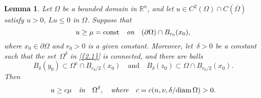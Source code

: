 \documentclass[regno,12pt]{amsart}
\newtheorem{lemma}[theorem]{Lemma}
\theoremstyle{definition}
\theoremstyle{remark}
\begin{document}
\begin{lemma}\label{L2.3}
    Let $\Omega$ be a bounded domain in ${{\mathbb R}^n}$, and let $u\in C^2(\Omega)\cap C({\overline{\Omega}})$ satisfy $u>0,\,Lu\le 0$ in $\Omega$. Suppose that
    \begin{equation}\label{2.8}
        u\ge\mu={{\rm const}}{\quad\emph{{on}}\quad} ({\partial\Omega})\cap B_{r_0}(x_0),
    \end{equation}
     where $x_0\in{\partial\Omega}$ and $r_0>0$ is a given constant. Moreover, let $\,\delta>0$ be a constant such that the set $\,\Omega^{\delta}$ in {\eqref{{2.1}}} is connected, and there are balls
    \begin{equation}\label{2.9}
        B_{\delta}(y_0){\subset} \Omega^c\cap B_{r_0/2}(x_0)
        {\quad\text{{and}}\quad}
        B_{\delta}(z_0){\subset} \Omega\cap B_{r_0/2}(x_0).
    \end{equation}
    Then
    \begin{equation}\label{2.10}
        u\ge c\mu{\quad\emph{{in}}\quad} \Omega^{\delta},
        {\quad\emph{{where}}\quad} c=c(n,\nu,\delta/{{\rm diam}\,}\Omega)>0.
    \end{equation}
\end{lemma}
\end{document}
